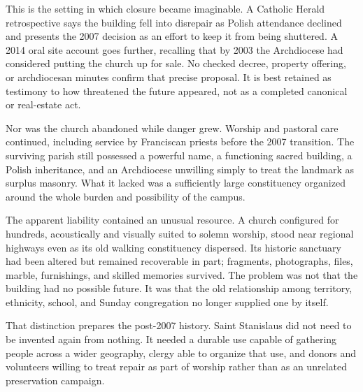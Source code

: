 This is the setting in which closure became imaginable. A Catholic Herald retrospective says the building fell into disrepair as Polish attendance declined and presents the 2007 decision as an effort to keep it from being shuttered. A 2014 oral site account goes further, recalling that by 2003 the Archdiocese had considered putting the church up for sale. No checked decree, property offering, or archdiocesan minutes confirm that precise proposal. It is best retained as testimony to how threatened the future appeared, not as a completed canonical or real-estate act.

Nor was the church abandoned while danger grew. Worship and pastoral care continued, including service by Franciscan priests before the 2007 transition. The surviving parish still possessed a powerful name, a functioning sacred building, a Polish inheritance, and an Archdiocese unwilling simply to treat the landmark as surplus masonry. What it lacked was a sufficiently large constituency organized around the whole burden and possibility of the campus.

The apparent liability contained an unusual resource. A church configured for hundreds, acoustically and visually suited to solemn worship, stood near regional highways even as its old walking constituency dispersed. Its historic sanctuary had been altered but remained recoverable in part; fragments, photographs, files, marble, furnishings, and skilled memories survived. The problem was not that the building had no possible future. It was that the old relationship among territory, ethnicity, school, and Sunday congregation no longer supplied one by itself.

That distinction prepares the post-2007 history. Saint Stanislaus did not need to be invented again from nothing. It needed a durable use capable of gathering people across a wider geography, clergy able to organize that use, and donors and volunteers willing to treat repair as part of worship rather than as an unrelated preservation campaign.


